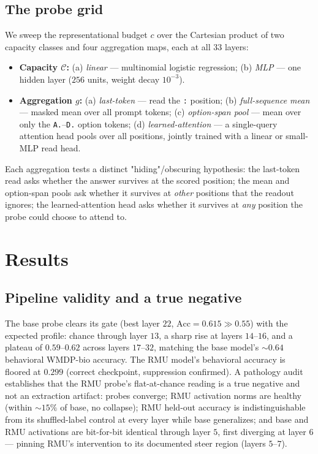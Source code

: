 \documentclass[11pt]{article}
\newcommand{\Acc}{\mathrm{Acc}}
\begin{document}
\subsection{The probe grid}
We sweep the representational budget $c$ over the Cartesian product of two capacity classes
and four aggregation maps, each at all $33$ layers:
\begin{itemize}[itemsep=2pt]
  \item \textbf{Capacity $\mathcal{C}$:} (a) \emph{linear} --- multinomial logistic
        regression; (b) \emph{MLP} --- one hidden layer ($256$ units, weight decay
        $10^{-3}$).
  \item \textbf{Aggregation $g$:} (a) \emph{last-token} --- read the \texttt{:} position;
        (b) \emph{full-sequence mean} --- masked mean over all prompt tokens;
        (c) \emph{option-span pool} --- mean over only the \texttt{A.}--\texttt{D.} option
        tokens; (d) \emph{learned-attention} --- a single-query attention head pools over
        all positions, jointly trained with a linear or small-MLP read head.
\end{itemize}
Each aggregation tests a distinct "hiding"/obscuring hypothesis: the last-token read asks whether the
answer survives at the scored position; the mean and option-span pools ask whether it
survives at \emph{other} positions that the readout ignores; the learned-attention head
asks whether it survives at \emph{any} position the probe could choose to attend to.

\section{Results}
 
\subsection{Pipeline validity and a true negative}
The base probe clears its gate (best layer $22$, $\Acc=0.615 \gg 0.55$) with the expected
profile: chance through layer $13$, a sharp rise at layers $14$--$16$, and a plateau of
$0.59$--$0.62$ across layers $17$--$32$, matching the base model's $\sim\!0.64$ behavioral
WMDP-bio accuracy. The RMU model's behavioral accuracy is floored at $0.299$ (correct
checkpoint, suppression confirmed). A pathology audit establishes that the RMU probe's
flat-at-chance reading is a true negative and not an extraction artifact: probes converge;
RMU activation norms are healthy (within $\sim\!15\%$ of base, no collapse); RMU held-out
accuracy is indistinguishable from its shuffled-label control at every layer while base
generalizes; and base and RMU activations are bit-for-bit identical through layer $5$,
first diverging at layer $6$ --- pinning RMU's intervention to its documented steer region
(layers $5$--$7$).
 
\end{document}
